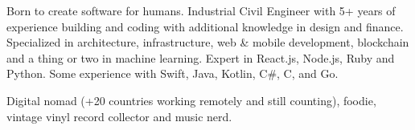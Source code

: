 

\begin{cvparagraph}

Born to create software for humans. Industrial Civil Engineer with 5+ years of experience building and coding with additional knowledge in design and finance. Specialized in architecture, infrastructure, web \& mobile development, blockchain and a thing or two in machine learning. Expert in React.js, Node.js, Ruby and Python. Some experience with Swift, Java, Kotlin, C\#, C, and Go.

Digital nomad (+20 countries working remotely and still counting), foodie, vintage vinyl record collector and music nerd.
\end{cvparagraph}
